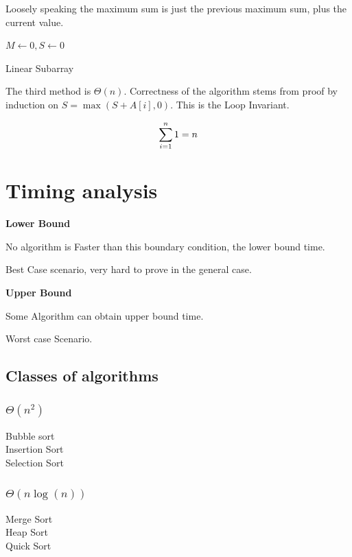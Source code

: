 \documentclass[english, 10pt]{article}
\begin{document}
Loosely speaking the maximum sum is just the previous maximum sum, plus the current value.

\begin{algorithm}[H]
$M \gets 0,S \gets 0$\;
\caption{Linear Subarray }
\end{algorithm}
The third method is $\Theta{\left(n\right)} $.\newline
Correctness of the algorithm stems from proof by induction on $S = \max(S+A[i], 0)$. This is the Loop Invariant.

$$
\sum_{i=1}^n 1 = n \\
$$

\section{Timing analysis}
\textbf{Lower Bound}

No algorithm is Faster than this boundary condition, the lower bound time.

Best Case scenario, very hard to prove in the general case.

\textbf{Upper Bound}

Some Algorithm can obtain upper bound time.

Worst case Scenario.

\subsection{Classes of algorithms}
\subsubsection{$\Theta(n^2)$}
    Bubble sort \\
    Insertion Sort \\
    Selection Sort \\
\subsubsection{$\Theta(n\log(n))$}
    Merge Sort \\
    Heap Sort \\
    Quick Sort \\
\end{document}
